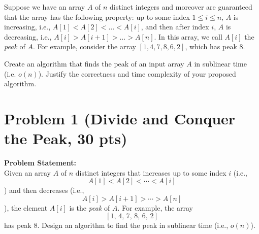\documentclass[11pt]{article}
\begin{document}
    \setlength{\headheight}{26pt}
    \pagestyle{fancy}
    \fancyfoot[C]{}
    \fancyfoot[R]{\thepage}
    \renewcommand{\headrulewidth}{0.4pt}
    \renewcommand{\footrulewidth}{0.4 pt}
    
	
    
    \begin{tcolorbox}[title={Problem 1 (Divide and Conquer the Peak, 30 pts)}]
        Suppose we have an array $A$ of $n$ distinct integers and moreover are guaranteed that the array has the following property: up to some index $1\leq i \leq n$, $A$ is increasing, i.e., $A[1] < A[2] < \ldots < A[i]$, and then after index $i$, $A$ is decreasing, i.e., $A[i] > A[i+1] > \ldots > A[n]$. In this array, we call $A[i]$ the \emph{peak} of $A$. For example, consider the array $[1, 4, 7, 8, 6, 2]$, which has peak $8$. 
        \medskip
        
        Create an algorithm that finds the peak of an input array $A$ in sublinear time (i.e. $o(n)$). Justify the correctness and time complexity of your proposed algorithm.
    \end{tcolorbox}
    \section*{Problem 1 (Divide and Conquer the Peak, 30 pts)}

    \textbf{Problem Statement:} \\
    Given an array \( A \) of \( n \) distinct integers that increases up to some index \( i \) (i.e., 
    \[
    A[1] < A[2] < \cdots < A[i]
    \]
    ) and then decreases (i.e., 
    \[
    A[i] > A[i+1] > \cdots > A[n]
    \]
    ), the element \( A[i] \) is the \emph{peak} of \( A \). For example, the array 
    \[
    [1,\, 4,\, 7,\, 8,\, 6,\, 2]
    \]
    has peak \( 8 \). Design an algorithm to find the peak in sublinear time (i.e., \( o(n) \)).
    
    \bigskip
    
\end{document}
